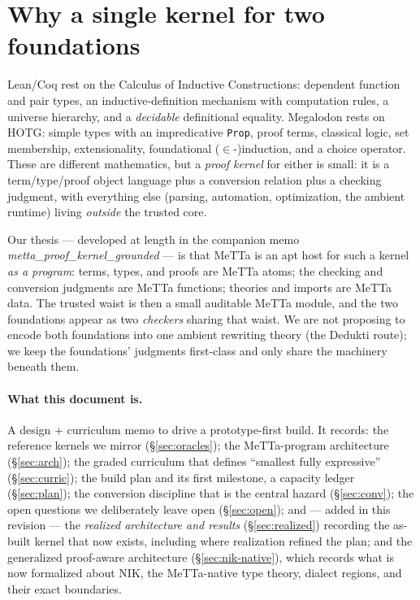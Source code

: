 \documentclass[11pt]{article}
\newcommand{\MeTTa}{MeTTa}
\newcommand{\HOTG}{HOTG}
\newcommand{\NIK}{NIK}
\newcommand{\code}[1]{\texttt{#1}}
\begin{document}
\section{Why a single kernel for two foundations}

Lean/Coq rest on the Calculus of Inductive Constructions: dependent function and
pair types, an inductive-definition mechanism with computation rules, a universe
hierarchy, and a \emph{decidable} definitional equality. Megalodon rests on
\HOTG{}: simple types with an impredicative \code{Prop}, proof terms, classical
logic, set membership, extensionality, foundational ($\in$-)induction, and a choice
operator. These are different mathematics, but a \emph{proof kernel} for either is
small: it is a term/type/proof object language plus a conversion relation plus a
checking judgment, with everything else (parsing, automation, optimization, the
ambient runtime) living \emph{outside} the trusted core.

Our thesis --- developed at length in the companion memo
\emph{metta\_proof\_kernel\_grounded} --- is that \MeTTa{} is an apt host for such a
kernel \emph{as a program}: terms, types, and proofs are \MeTTa{} atoms; the
checking and conversion judgments are \MeTTa{} functions; theories and imports are
\MeTTa{} data. The trusted waist is then a small auditable \MeTTa{} module, and the
two foundations appear as two \emph{checkers} sharing that waist. We are not
proposing to encode both foundations into one ambient rewriting theory (the
Dedukti route); we keep the foundations' judgments first-class and only share the
machinery beneath them.

\paragraph{What this document is.} A design + curriculum memo to drive a
prototype-first build. It records: the reference kernels we mirror
(\S\ref{sec:oracles}); the \MeTTa-program architecture (\S\ref{sec:arch}); the
graded curriculum that defines ``smallest fully expressive'' (\S\ref{sec:curric});
the build plan and its first milestone, a capacity ledger (\S\ref{sec:plan});
the conversion discipline that is the central hazard (\S\ref{sec:conv}); the
open questions we deliberately leave open (\S\ref{sec:open}); and --- added in this
revision --- the \emph{realized architecture and results} (\S\ref{sec:realized})
recording the as-built kernel that now exists, including where realization refined
the plan; and the generalized proof-aware architecture
(\S\ref{sec:nik-native}), which records what is now formalized about \NIK{}, the
MeTTa-native type theory, dialect regions, and their exact boundaries.
\end{document}
